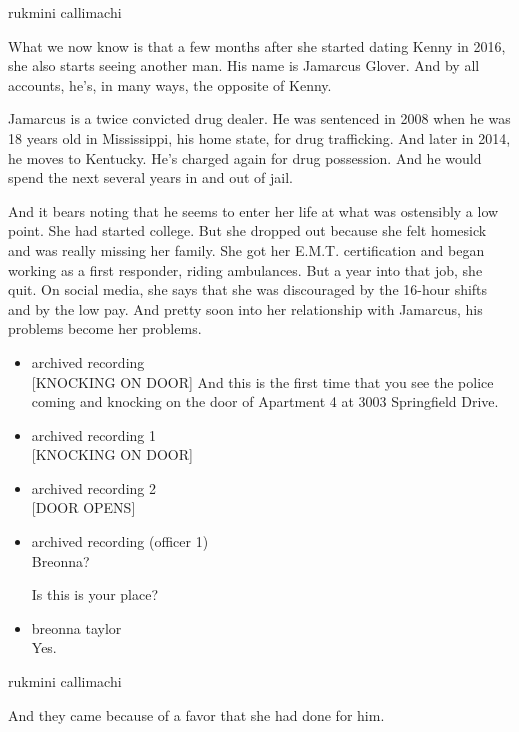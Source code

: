 rukmini callimachi

What we now know is that a few months after she started dating Kenny in
2016, she also starts seeing another man. His name is Jamarcus Glover.
And by all accounts, he's, in many ways, the opposite of Kenny.

Jamarcus is a twice convicted drug dealer. He was sentenced in 2008 when
he was 18 years old in Mississippi, his home state, for drug
trafficking. And later in 2014, he moves to Kentucky. He's charged again
for drug possession. And he would spend the next several years in and
out of jail.

And it bears noting that he seems to enter her life at what was
ostensibly a low point. She had started college. But she dropped out
because she felt homesick and was really missing her family. She got her
E.M.T. certification and began working as a first responder, riding
ambulances. But a year into that job, she quit. On social media, she
says that she was discouraged by the 16-hour shifts and by the low pay.
And pretty soon into her relationship with Jamarcus, his problems become
her problems.

\begin{itemize}
\item
  archived recording\\
  {[}KNOCKING ON DOOR{]} And this is the first time that you see the
  police coming and knocking on the door of Apartment 4 at 3003
  Springfield Drive.
\item
  archived recording 1\\
  {[}KNOCKING ON DOOR{]}
\item
  archived recording 2\\
  {[}DOOR OPENS{]}
\item
  archived recording (officer 1)\\
  Breonna?

  Is this is your place?
\item
  breonna taylor\\
  Yes.
\end{itemize}

rukmini callimachi

And they came because of a favor that she had done for him.

